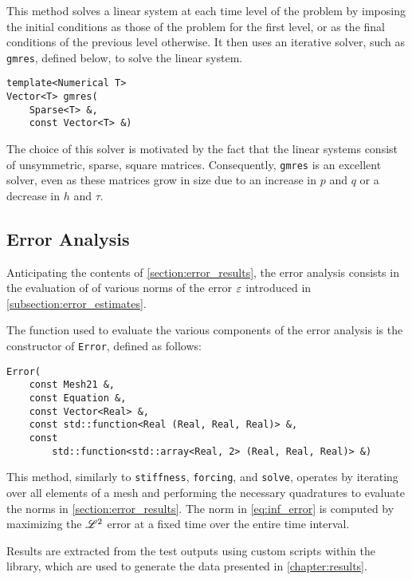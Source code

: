 This method solves a linear system at each time level of the problem by imposing the initial conditions as those of the problem for the first level, or as the final conditions of the previous level otherwise. It then uses an iterative solver, such as \lstinline{gmres}, defined below, to solve the linear system.

\begin{lstlisting}[style=cpp]
template<Numerical T>
Vector<T> gmres(
    Sparse<T> &,
    const Vector<T> &)
\end{lstlisting}

The choice of this solver is motivated by the fact that the linear systems consist of unsymmetric, sparse, square matrices. Consequently, \lstinline{gmres} is an excellent solver, even as these matrices grow in size due to an increase in $p$ and $q$ or a decrease in $h$ and $\tau$.

\newpage
\subsection{Error Analysis}

Anticipating the contents of \cref{section:error_results}, the error analysis consists in the evaluation of of various norms of the error $\varepsilon$ introduced in \cref{subsection:error_estimates}.

The function used to evaluate the various components of the error analysis is the constructor of \lstinline{Error}, defined as follows:
\begin{lstlisting}[style=cpp]
Error(
    const Mesh21 &, 
    const Equation &, 
    const Vector<Real> &, 
    const std::function<Real (Real, Real, Real)> &, 
    const 
        std::function<std::array<Real, 2> (Real, Real, Real)> &)
\end{lstlisting}

This method, similarly to \lstinline{stiffness}, \lstinline{forcing}, and \lstinline{solve}, operates by iterating over all elements of a mesh and performing the necessary quadratures to evaluate the norms in \cref{section:error_results}. The norm in \cref{eq:inf_error} is computed by maximizing the $\mathscr{L}^{2}$ error at a fixed time over the entire time interval.

Results are extracted from the test outputs using custom scripts within the library, which are used to generate the data presented in \cref{chapter:results}.